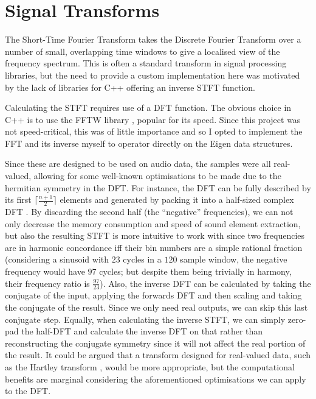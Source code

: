 \documentclass[12pt,a4paper,twoside,openright]{report}
\begin{document}
\section{Signal Transforms}

The Short-Time Fourier Transform takes the Discrete Fourier Transform over a number of small, overlapping time windows to give a localised view of the frequency spectrum. {\color{red}This is often a standard transform in signal processing libraries, but the need to provide a custom implementation here was motivated by the lack of libraries for C++ offering an inverse STFT function.}

Calculating the STFT requires use of a DFT function. The obvious choice in C++ is to use the FFTW library \cite{fftw}, popular for its speed. Since this project was not speed-critical, this was of little importance and so I opted to implement the FFT and its inverse myself to operator directly on the Eigen data structures.

Since these are designed to be used on audio data, the samples were all real-valued, allowing for some well-known optimisations to be made due to the hermitian symmetry in the DFT. {\color{red}For instance, the DFT can be fully described by its first $ \lceil \frac{n+1}{2} \rceil $ elements and generated by packing it into a half-sized complex DFT \cite{sorensen1987real}.} By discarding the second half (the ``negative'' frequencies), we can not only decrease the memory consumption and speed of sound element extraction, but also the resulting STFT is more intuitive to work with since two frequencies are in harmonic concordance iff their bin numbers are a simple rational fraction (considering a sinusoid with $ 23 $ cycles in a $ 120 $ sample window, the negative frequency would have $ 97 $ cycles; but despite them being trivially in harmony, their frequency ratio is $ \frac{97}{23} $). Also, the inverse DFT can be calculated by taking the conjugate of the input, applying the forwards DFT and then scaling and taking the conjugate of the result. Since we only need real outputs, we can skip this last conjugate step. Equally, when calculating the inverse STFT, we can simply zero-pad the half-DFT and calculate the inverse DFT on that rather than reconstructing the conjugate symmetry since it will not affect the real portion of the result. {\color{red}It could be argued that a transform designed for real-valued data, such as the Hartley transform \cite{hartley1942more}, would be more appropriate, but the computational benefits are marginal considering the aforementioned optimisations we can apply to the DFT.}
\end{document}
